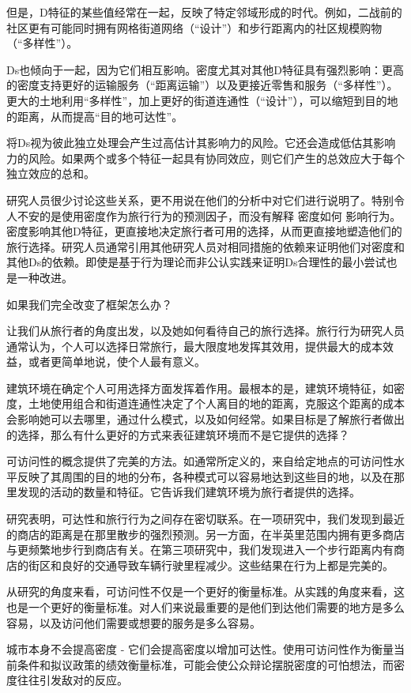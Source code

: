 \documentclass[12pt,]{article}
\begin{document}
但是，D特征的某些值经常在一起，反映了特定邻域形成的时代。例如，二战前的社区更有可能同时拥有网格街道网络（``设计''）和步行距离内的社区规模购物（``多样性''）。

Ds也倾向于一起，因为它们相互影响。密度尤其对其他D特征具有强烈影响：更高的密度支持更好的运输服务（``距离运输''）以及更接近零售和服务（``多样性''）。更大的土地利用``多样性''，加上更好的街道连通性（``设计''），可以缩短到目的地的距离，从而提高``目的地可达性''。

将Ds视为彼此独立处理会产生过高估计其影响力的风险。它还会造成低估其影响力的风险。如果两个或多个特征一起具有协同效应，则它们产生的总效应大于每个独立效应的总和。

研究人员很少讨论这些关系，更不用说在他们的分析中对它们进行说明了。特别令人不安的是使用密度作为旅行行为的预测因子，而没有解释
密度如何
影响行为。密度影响其他D特征，更直接地决定旅行者可用的选择，从而更直接地塑造他们的旅行选择。研究人员通常引用其他研究人员对相同措施的依赖来证明他们对密度和其他Ds的依赖。即使是基于行为理论而非公认实践来证明Ds合理性的最小尝试也是一种改进。

如果我们完全改变了框架怎么办？

让我们从旅行者的角度出发，以及她如何看待自己的旅行选择。旅行行为研究人员通常认为，个人可以选择日常旅行，最大限度地发挥其效用，提供最大的成本效益，或者更简单地说，使个人最有意义。

建筑环境在确定个人可用选择方面发挥着作用。最根本的是，建筑环境特征，如密度，土地使用组合和街道连通性决定了个人离目的地的距离，克服这个距离的成本会影响她可以去哪里，通过什么模式，以及如何经常。如果目标是了解旅行者做出的选择，那么有什么更好的方式来表征建筑环境而不是它提供的选择？

可访问性的概念提供了完美的方法。如通常所定义的，来自给定地点的可访问性水平反映了其周围的目的地的分布，各种模式可以容易地达到这些目的地，以及在那里发现的活动的数量和特征。它告诉我们建筑环境为旅行者提供的选择。

研究表明，可达性和旅行行为之间存在密切联系。在一项研究中，我们发现到最近的商店的距离是在那里散步的强烈预测。另一方面，在半英里范围内拥有更多商店与更频繁地步行到商店有关。在第三项研究中，我们发现进入一个步行距离内有商店的街区和良好的交通导致车辆行驶里程减少。这些结果在行为上都是完美的。

从研究的角度来看，可访问性不仅是一个更好的衡量标准。从实践的角度来看，这也是一个更好的衡量标准。对人们来说最重要的是他们到达他们需要的地方是多么容易，以及访问他们需要或想要的服务是多么容易。

城市本身不会提高密度 -
它们会提高密度以增加可达性。使用可访问性作为衡量当前条件和拟议政策的绩效衡量标准，可能会使公众辩论摆脱密度的可怕想法，而密度往往引发敌对的反应。
\end{document}

